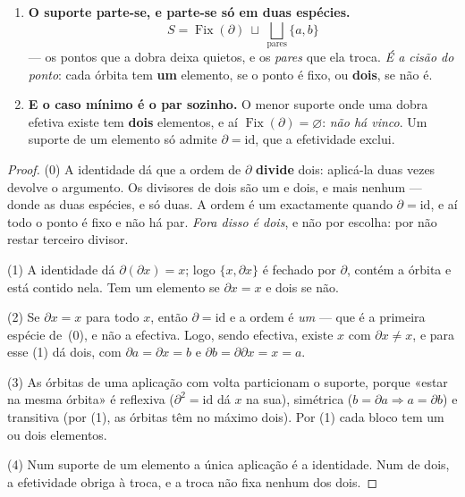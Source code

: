 \documentclass[livro.tex]{subfiles}
\begin{document}
\begin{teorema}
\begin{enumerate}
\smallskip
\emph{E o par vem \textbf{sem ordem}, que é o que o resto deste documento vai
usar}: os nomes $a$ e $b$ saíram de se ter escolhido começar em $x$, e começar em
$\partial x$ dá a mesma órbita com os dois nomes trocados --- $a'=\partial x=b$ e
$b'=\partial\partial x=x=a$. \textbf{Nada na Def.~\ref{fis:def:op} prefere um dos
dois começos}, pelo que
\[
\boxed{\;\text{a dobra dá o \textbf{par}, e não diz qual é o primeiro}\;}
\]
--- \emph{o ponto sozinho não sabe do outro; quem sabe é o par}. É desta cláusula,
e não de outra, que sai o bit que a orientação há de custar.
\item[(3)] \textbf{O suporte parte-se, e parte-se só em duas espécies.}
\[
\boxed{\;S=\operatorname{Fix}(\partial)\ \sqcup\ \bigsqcup_{\text{pares}}\{a,b\}\;}
\]
--- os pontos que a dobra deixa quietos, e os \emph{pares} que ela troca. \emph{É
a cisão do ponto}: cada órbita tem \textbf{um} elemento, se o ponto é fixo, ou
\textbf{dois}, se não é.
\item[(4)] \textbf{E o caso mínimo é o par sozinho.} O menor suporte onde uma
dobra efetiva existe tem \textbf{dois} elementos, e aí
$\operatorname{Fix}(\partial)=\varnothing$: \emph{não há vinco}. Um suporte de um
elemento só admite $\partial=\mathrm{id}$, que a efetividade exclui.
\end{enumerate}
\end{teorema}
\begin{proof}
(0) A identidade dá que a ordem de $\partial$ \textbf{divide} dois: aplicá-la duas
vezes devolve o argumento. Os divisores de dois são um e dois, e mais nenhum ---
donde as duas espécies, e só duas. A ordem é um exactamente quando
$\partial=\mathrm{id}$, e aí todo o ponto é fixo e não há par. \emph{Fora disso é
dois}, e não por escolha: por não restar terceiro divisor.

(1) A identidade dá $\partial(\partial x)=x$; logo $\{x,\partial x\}$ é fechado
por $\partial$, contém a órbita e está contido nela. Tem um elemento se
$\partial x=x$ e dois se não.

(2) Se $\partial x=x$ para todo $x$, então $\partial=\mathrm{id}$ e a ordem é
\emph{um} --- que é a primeira espécie de~(0), e não a efectiva. Logo, sendo
efectiva, existe $x$ com $\partial x\neq x$, e para esse (1) dá dois, com
$\partial a=\partial x=b$ e
$\partial b=\partial\partial x=x=a$.

(3) As órbitas de uma aplicação com volta particionam o suporte, porque «estar na
mesma órbita» é reflexiva ($\partial^{2}=\mathrm{id}$ dá $x$ na sua), simétrica
($b=\partial a\Rightarrow a=\partial b$) e transitiva (por (1), as órbitas têm no
máximo dois). Por (1) cada bloco tem um ou dois elementos.

(4) Num suporte de um elemento a única aplicação é a identidade. Num de dois, a
efetividade obriga à troca, e a troca não fixa nenhum dos dois.
\end{proof}
\end{document}
